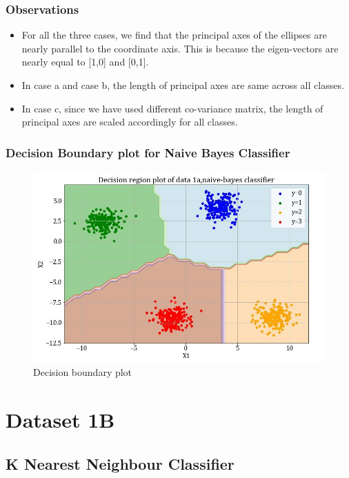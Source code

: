 \documentclass[11pt,a4paper]{article}
\newcommand{\noi}{\noindent}
\begin{document}
\subsubsection{Observations} 
\begin{itemize}
    \itemsep0em
    \item For all the three cases, we find that the principal axes of the ellipses are nearly parallel to the coordinate axis. This is because the eigen-vectors are nearly equal to [1,0] and [0,1].
    \item In case a and case b, the length of principal axes are same across all classes. 
    \item In case c, since we have used different co-variance matrix, the length of principal axes are scaled accordingly for all classes.
\end{itemize}

\subsubsection{Decision Boundary plot for Naive Bayes Classifier}
\begin{figure}[H]
    \centering
    \includegraphics[scale=0.8]{images/1A_nb_case1_decisionregion.jpg}
    \caption{Decision boundary plot}
    \label{fig:db1}
\end{figure}

\noi

\break
\section{Dataset 1B}
\subsection{K Nearest Neighbour Classifier} 
\end{document}
